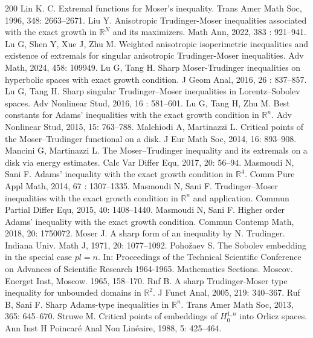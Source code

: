 \documentclass[11pt]{article}
\theoremstyle{plain}
\numberwithin{equation}{section}
\newcommand{\R}{\mathbb{R}}
\begin{document}
\begin{thebibliography}{200}
  Lin K. C. Extremal functions for Moser's inequality. Trans Amer Math Soc, 1996, 348: 2663--2671.
  Liu Y.  Anisotropic Trudinger-Moser inequalities associated with the exact growth in
$\mathbb{R}^{N}$ and its maximizers.  Math Ann, 2022, 383 : 921--941.
  Lu G,  Shen Y, Xue J,  Zhu M. Weighted anisotropic isoperimetric inequalities
and existence of extremals for singular anisotropic Trudinger-Moser inequalities.  Adv
Math,  2024, 458: 109949.
  Lu G, Tang H.  Sharp Moser-Trudinger inequalities on
hyperbolic spaces with exact growth condition.  J Geom Anal, 2016, 26 : 837--857.
   Lu G,  Tang H. Sharp singular Trudinger--Moser inequalities in Lorentz--Sobolev spaces.  Adv Nonlinear Stud,   2016, 16 : 581--601.
  Lu G,  Tang H,  Zhu M.  Best constants for Adams' inequalities with the exact growth condition in
$\R^{n}$.  Adv Nonlinear Stud, 2015, 15: 763--788.
  Malchiodi A,  Martinazzi L. Critical points of the Moser--Trudinger functional on a disk.  J Eur Math Soc,
2014,  16: 893--908.
 Mancini  G,   Martinazzi L. The Moser--Trudinger inequality and its extremals on a disk via energy
estimates.  Calc Var Differ Equ,  2017, 20: 56--94.
   Masmoudi N,  Sani F.  Adams' inequality with the exact growth condition in $\mathbb{R}^4$.  Comm Pure Appl Math,  2014,  67 : 1307--1335.
   Masmoudi N,  Sani F.   Trudinger--Moser inequalities with the exact growth condition in $\mathbb{R}^n$ and application. Commun
Partial Differ Equ,  2015, 40:  1408--1440.
  Masmoudi N,  Sani F.  Higher order Adams' inequality with the exact growth condition. Commun
Contemp Math, 2018, 20: 1750072.
  Moser J.  A sharp form of an inequality by N. Trudinger. Indiana Univ. Math J,   1971, 20: 1077--1092.
   Poho\v{z}aev  S. The Sobolev embedding in the special case $pl = n$. In: Proceedings of the Technical Scientific Conference on Advances of Scientific Research 1964-1965. Mathematics Sections. Moscov. Energet Inst, Moscow.  1965, 158--170.
  Ruf B. A sharp Trudinger-Moser type inequality for unbounded domains in $\R^{2}$. J Funct Anal,  2005, 219: 340--367.
   Ruf B,   Sani F. Sharp Adams-type inequalities in $\mathbb{R}^{n}$.   Trans Amer Math Soc,    2013, 365: 645--670.
  Struwe  M. Critical points of embeddings of $H^{1,n}_{0}$ into Orlicz spaces.  Ann Inst H Poincar\'{e} Anal Non Lin\'{e}aire,   1988, 5: 425--464.

\end{thebibliography}
\end{document}
